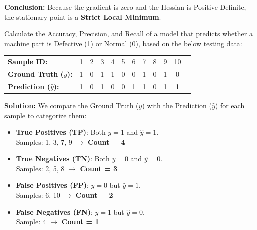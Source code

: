 \documentclass[12pt]{exam}
\begin{document}
\begin{questions}
\begin{enumerate}
                \textbf{Conclusion:} Because the gradient is zero and the Hessian is Positive Definite, the stationary point is a \textbf{Strict Local Minimum}.
            \end{enumerate}
            
             Calculate the Accuracy, Precision, and Recall of a model that predicts whether a machine part is Defective (1) or Normal (0), based on the below testing data:
                \begin{center}
                \begin{tabular}{lccccccccccc}
                \textbf{Sample ID:} & 1 & 2 & 3 & 4 & 5 & 6 & 7 & 8 & 9 & 10 \\
                \textbf{Ground Truth ($y$):} & 1 & 0 & 1 & 1 & 0 & 0 & 1 & 0 & 1 & 0 \\
                \textbf{Prediction ($\hat{y}$):} & 1 & 0 & 1 & 0 & 0 & 1 & 1 & 0 & 1 & 1 \\
                \end{tabular}
                \end{center}
            
                \textbf{Solution:}    We compare the Ground Truth ($y$) with the Prediction ($\hat{y}$) for each sample to categorize them:
                
                \begin{itemize}
                    \item \textbf{True Positives (TP)}: Both $y=1$ and $\hat{y}=1$. \\
                    Samples: 1, 3, 7, 9 $\rightarrow$ \textbf{Count = 4}
                    
                    \item \textbf{True Negatives (TN)}: Both $y=0$ and $\hat{y}=0$. \\
                    Samples: 2, 5, 8 $\rightarrow$ \textbf{Count = 3}
                    
                    \item \textbf{False Positives (FP)}: $y=0$ but $\hat{y}=1$. \\
                    Samples: 6, 10 $\rightarrow$ \textbf{Count = 2}
                    
                    \item \textbf{False Negatives (FN)}: $y=1$ but $\hat{y}=0$. \\
                    Sample: 4 $\rightarrow$ \textbf{Count = 1}
                \end{itemize}
                

\end{questions}
\end{document}
